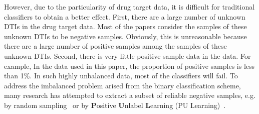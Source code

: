 \documentclass[journal]{IEEEtran}
\begin{document}
However, due to the particularity of drug target data, it is difficult for traditional classifiers to obtain a better effect. First, there are a large number of unknown DTIs in the drug target data. Most of the papers consider the samples of these unknown DTIs to be negative samples. Obviously, this is unreasonable because there are a large number of positive samples among the samples of these unknown DTIs. 
Second, there is very little positive sample data in the data. For example, In the data used in this paper, the proportion of positive samples is less than 1\%. In such highly unbalanced data, most of the classifiers will fail. To address the imbalanced problem arised from the binary classification scheme, many research has attempted to extract a subset of reliable negative samples, e.g. by random sampling~\cite{Luo2017Network} or by \textbf{P}ositive \textbf{U}nlabel \textbf{L}earning (PU Learning)~\cite{Peng2017Screening}.
\end{document}
